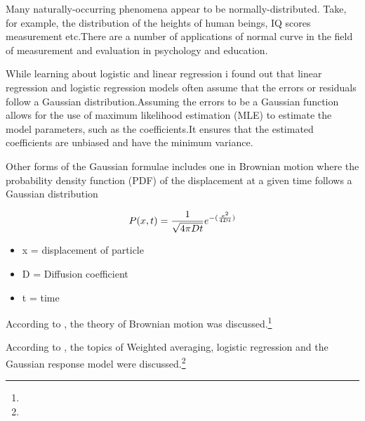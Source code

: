 \documentclass[12pt]{article}
\begin{document}
Many naturally-occurring phenomena appear to be normally-distributed. Take, for example, the distribution of the heights of human beings, IQ scores measurement etc.There are a number of applications of normal curve in the field of measurement and evaluation in psychology and education.

\medskip
While learning about logistic and linear regression i found out that linear regression and logistic regression models often assume that the errors or residuals follow a Gaussian distribution.Assuming the errors to be a Gaussian function allows for the use of maximum likelihood estimation (MLE) to estimate the model parameters, such as the coefficients.It ensures that the estimated coefficients are unbiased and have the minimum variance.

\medskip
Other forms of the Gaussian formulae includes one in Brownian motion where the probability density function (PDF) of the displacement at a given time follows a Gaussian distribution

\bigskip    
\begin{equation}
    \Large P(x,t)=\frac{1}{\sqrt{4\pi Dt}}e^{-(\frac{x^2}{4Dt})}
\end{equation}
\begin{itemize}
    \item x = displacement of particle
    \item D = Diffusion coefficient 
    \item t = time
\end{itemize}

\bigskip
According to \cite{Uhlenbeck1930}, the theory of Brownian motion was discussed.\footnote{
}

\medskip
According to \cite{terBraak1986}, the topics of Weighted averaging, logistic regression and the Gaussian response model were discussed.\footnote{}
\end{document}

